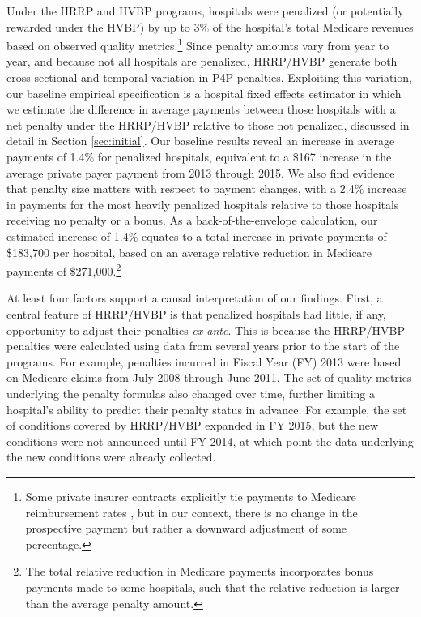 \documentclass[12pt]{article}
\begin{document}
Under the HRRP and HVBP programs, hospitals were penalized (or potentially rewarded under the HVBP) by up to 3$\%$ of the hospital's total Medicare revenues based on observed quality metrics.\footnote{Some private insurer contracts explicitly tie payments to Medicare reimbursement rates \citep{cooper2017}, but in our context, there is no change in the prospective payment but rather a downward adjustment of some percentage.} Since penalty amounts vary from year to year, and because not all hospitals are penalized, HRRP/HVBP generate both cross-sectional and temporal variation in P4P penalties. Exploiting this variation, our baseline empirical specification is a hospital fixed effects estimator in which we estimate the difference in average payments between those hospitals with a net penalty under the HRRP/HVBP relative to those not penalized, discussed in detail in Section \ref{sec:initial}. Our baseline results reveal an increase in average payments of 1.4$\%$ for penalized hospitals, equivalent to a $\$$167 increase in the average private payer payment from 2013 through 2015. We also find evidence that penalty size matters with respect to payment changes, with a 2.4$\%$ increase in payments for the most heavily penalized hospitals relative to those hospitals receiving no penalty or a bonus. As a back-of-the-envelope calculation, our estimated increase of 1.4\% equates to a total increase in private payments of \$183,700 per hospital, based on an average relative reduction in Medicare payments of \$271,000.\footnote{The total relative reduction in Medicare payments incorporates bonus payments made to some hospitals, such that the relative reduction is larger than the average penalty amount.}

At least four factors support a causal interpretation of our findings. First, a central feature of HRRP/HVBP is that penalized hospitals had little, if any, opportunity to adjust their penalties \textit{ex ante}. This is because the HRRP/HVBP penalties were calculated using data from several years prior to the start of the programs. For example, penalties incurred in Fiscal Year (FY) 2013 were based on Medicare claims from July 2008 through June 2011. The set of quality metrics underlying the penalty formulas also changed over time, further limiting a hospital's ability to predict their penalty status in advance. For example, the set of conditions covered by HRRP/HVBP expanded in FY 2015, but the new conditions were not announced until FY 2014, at which point the data underlying the new conditions were already collected.
\end{document}
